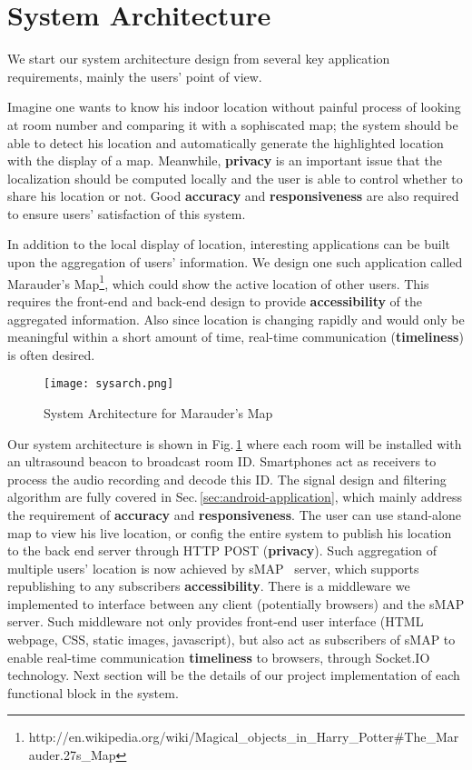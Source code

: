 \section{System Architecture}
\label{sec:system-architecture}
We start our system architecture design from several key application requirements, mainly the users' point of view.

Imagine one wants to know his indoor location without painful process of looking at room number and comparing it with a sophiscated map; the system should be able to detect his location and automatically generate the highlighted location with the display of a map. Meanwhile, {\bf privacy} is an important issue that the localization should be computed locally and the user is able to control whether to share his location or not. Good {\bf accuracy} and {\bf responsiveness} are also required to ensure users' satisfaction of this system.  

In addition to the local display of location, interesting applications can be built upon the aggregation of users' information. We design one such application called Marauder's Map\footnote{http://en.wikipedia.org/wiki/Magical\_objects\_in\_Harry\_Potter\#The\_Marauder.27s\_Map}, which could show the active location of other users. This requires the front-end and back-end design to provide {\bf accessibility} of the aggregated information. Also since location is changing rapidly and would only be meaningful within a short amount of time, real-time communication ({\bf timeliness}) is often desired.

\begin{figure}
  \centering
  \texttt{[image: sysarch.png]}
  \caption{System Architecture for Marauder's Map}
  \label{fig:sysarch}
\end{figure}

Our system architecture is shown in Fig.\,\ref{fig:sysarch} where each room will be installed with an ultrasound beacon to broadcast room ID. Smartphones act as receivers to process the audio recording and decode this ID. The signal design and filtering algorithm are fully covered in Sec.\,\ref{sec:android-application}, which mainly address the requirement of {\bf accuracy} and {\bf responsiveness}. The user can use stand-alone map to view his live location, or config the entire system to publish his location to the back end server through HTTP POST ({\bf privacy}). Such aggregation of multiple users' location is now achieved by sMAP~\cite{dawson2010smap} server, which supports republishing to any subscribers {\bf accessibility}. There is a middleware we implemented to interface between any client (potentially browsers) and the sMAP server. Such middleware not only provides front-end user interface (HTML webpage, CSS, static images, javascript), but also act as subscribers of sMAP to enable real-time communication {\bf timeliness} to browsers, through Socket.IO~\cite{socketio} technology. Next section will be the details of our project implementation of each functional block in the system.

